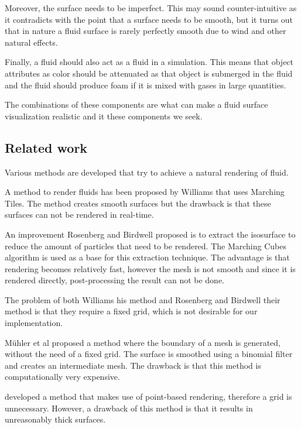 Moreover, the surface needs to be imperfect. This may sound counter-intuitive as it contradicts with the point that a surface needs to be smooth, but it turns out that in nature a fluid surface is rarely perfectly smooth due to wind and other natural effects.

Finally, a fluid should also act as a fluid in a simulation. This means that object attributes as color should be attenuated as that object is submerged in the fluid and the fluid should produce foam if it is mixed with gases in large quantities. 

The combinations of these components are what can make a fluid surface visualization realistic and it these components we seek.

\subsection{Related work}
Various methods are developed that try to achieve a natural rendering of fluid.

A method to render fluids has been proposed by Williams \cite{williams2008fluid} that uses Marching Tiles. 
The method creates smooth surfaces but the drawback is that these surfaces can not be rendered in real-time.

An improvement Rosenberg and Birdwell \cite{rosenberg2008real} proposed is to extract the isosurface to reduce the amount of particles that need to be rendered.
The Marching Cubes algorithm is used as a base for this extraction technique.
The advantage is that rendering becomes relatively fast, however the mesh is not smooth and since it is rendered directly, post-processing the result can not be done.

The problem of both Williams his method and Rosenberg and Birdwell their method is that they require a fixed grid, which is not desirable for our implementation. 

M\"uhler et al\cite{muller2007screen} proposed a method where the boundary of a mesh is generated, without the need of a fixed grid.
The surface is smoothed using a binomial filter and creates an intermediate mesh.
The drawback is that this method is computationally very expensive.

\cite{zhang2008adaptive} developed a method that makes use of point-based rendering, therefore a grid is unnecessary.
However, a drawback of this method is that it results in unreasonably thick surfaces.
